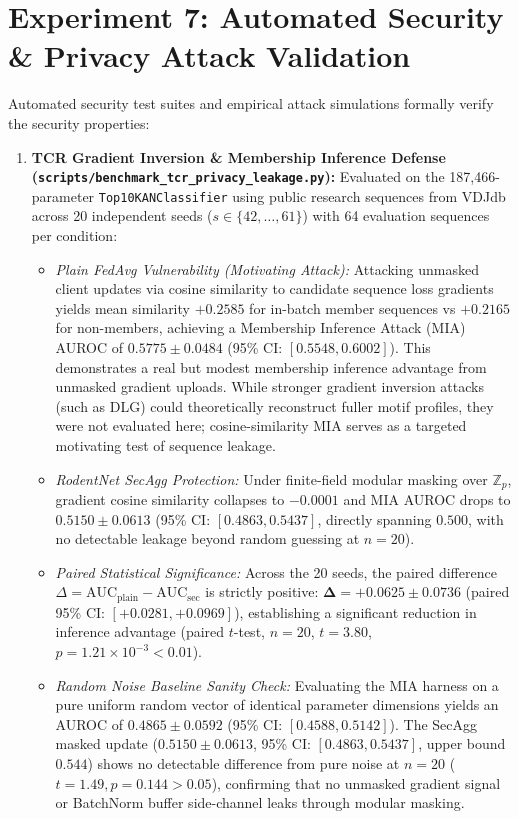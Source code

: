 \documentclass[11pt,a4paper]{report}
\begin{document}
\section{Experiment 7: Automated Security \& Privacy Attack Validation}
Automated security test suites and empirical attack simulations formally verify the security properties:
\begin{enumerate}[itemsep=3pt]
  \item \textbf{TCR Gradient Inversion \& Membership Inference Defense (\lstinline|scripts/benchmark_tcr_privacy_leakage.py|):} Evaluated on the 187{,}466-parameter \lstinline|Top10KANClassifier| using public research sequences from VDJdb across 20 independent seeds ($s \in \{42, \dots, 61\}$) with 64 evaluation sequences per condition:
  \begin{itemize}[itemsep=1pt]
    \item \textit{Plain FedAvg Vulnerability (Motivating Attack):} Attacking unmasked client updates via cosine similarity to candidate sequence loss gradients yields mean similarity $+0.2585$ for in-batch member sequences vs $+0.2165$ for non-members, achieving a Membership Inference Attack (MIA) AUROC of $\mathbf{0.5775 \pm 0.0484}$ (95\% CI: $[0.5548, 0.6002]$). This demonstrates a real but modest membership inference advantage from unmasked gradient uploads. While stronger gradient inversion attacks (such as DLG) could theoretically reconstruct fuller motif profiles, they were not evaluated here; cosine-similarity MIA serves as a targeted motivating test of sequence leakage.
    \item \textit{RodentNet SecAgg Protection:} Under finite-field modular masking over $\mathbb{Z}_p$, gradient cosine similarity collapses to $-0.0001$ and MIA AUROC drops to $\mathbf{0.5150 \pm 0.0613}$ (95\% CI: $[0.4863, 0.5437]$, directly spanning $0.500$, with no detectable leakage beyond random guessing at $n=20$).
    \item \textit{Paired Statistical Significance:} Across the 20 seeds, the paired difference $\Delta = \text{AUC}_{\text{plain}} - \text{AUC}_{\text{sec}}$ is strictly positive: $\mathbf{\Delta = +0.0625 \pm 0.0736}$ (paired 95\% CI: $[+0.0281, +0.0969]$), establishing a significant reduction in inference advantage (paired $t$-test, $n=20$, $t = 3.80$, $p = 1.21 \times 10^{-3} < 0.01$).
    \item \textit{Random Noise Baseline Sanity Check:} Evaluating the MIA harness on a pure uniform random vector of identical parameter dimensions yields an AUROC of $0.4865 \pm 0.0592$ (95\% CI: $[0.4588, 0.5142]$). The SecAgg masked update ($0.5150 \pm 0.0613$, 95\% CI: $[0.4863, 0.5437]$, upper bound $0.544$) shows no detectable difference from pure noise at $n=20$ ($t = 1.49, p = 0.144 > 0.05$), confirming that no unmasked gradient signal or BatchNorm buffer side-channel leaks through modular masking.

\end{itemize}
\end{enumerate}
\end{document}
